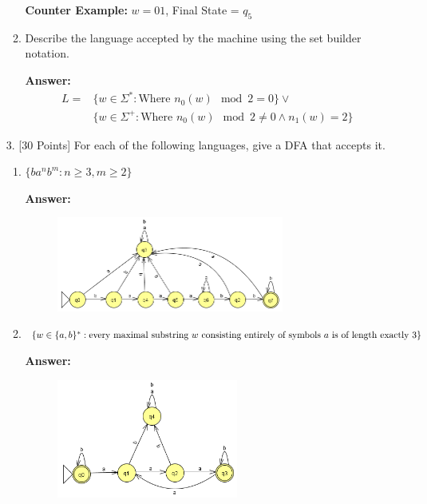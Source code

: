 \documentclass[12pt]{article}
\begin{document}
\begin{enumerate}
\begin{enumerate}
		            \textbf{Counter Example:} $w = 01$, Final State = $q_5$

		      \item Describe the language accepted by the machine using the set builder notation.

		            \noindent \textbf{Answer:}
		            \begin{equation}
			            \begin{split}
				            L = & \{w \in \Sigma^* : \text{Where } n_0(w) \mod 2 = 0 \} \lor \\ & \{w \in \Sigma^+ : \text{Where } n_0(w) \mod 2 \neq 0 \land n_1(w) = 2 \}
			            \end{split}
		            \end{equation}

	      \end{enumerate}

	      \newpage

	\item[3.] [30 Points] For each of the following languages, give a DFA that accepts it.

	      \begin{enumerate}
		      \item $\{ba^nb^m : n \geq 3, m \geq 2 \}$

		            \noindent \textbf{Answer:}

		            \begin{figure}[h!]
			            \centering
			            \includegraphics[width=0.75\textwidth]{img/q3/q3_a.png}
		            \end{figure}

		      \item $\{w \in \{a,b \}^* : \text{every maximal substring } w \text{ consisting entirely of symbols } a \\ \text{ is of length exactly 3} \}$

		            \noindent \textbf{Answer:}

		            \begin{figure}[h!]
			            \centering
			            \includegraphics[width=0.6\textwidth]{img/q3/q3_b.png}
		            \end{figure}


\end{enumerate}
\end{enumerate}
\end{document}
